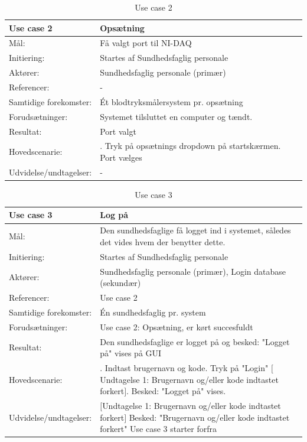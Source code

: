 \begin{table}[H]
\caption{Use case 2}\label{tab:tabel3}
\begin{tabular}{| l | >{\raggedright\arraybackslash}p{11cm} |}
   \hline
   \textbf{Use case 2} & \textbf{Opsætning}\\ \hline
   Mål: & Få valgt port til NI-DAQ \\ \hline
   Initiering: & Startes af Sundhedsfaglig personale\\ \hline
   Aktører:& Sundhedsfaglig personale (primær) \\ \hline
   Referencer: &  -\\ \hline
   Samtidige forekomster: & Ét blodtryksmålersystem pr. opsætning \\\hline
   Forudsætninger: & Systemet tilsluttet en computer og tændt. \\ \hline
   Resultat:& Port valgt\\ \hline
   Hovedscenarie:& 
1. Tryk på opsætnings dropdown på startskærmen\newline
2. Port vælges \\\hline
Udvidelse/undtagelser: & -\\\hline
\end{tabular}
\end{table}



\begin{table}[H]
\caption{Use case 3}\label{tab:tabel3}
\begin{tabular}{| l | >{\raggedright\arraybackslash}p{11cm} |}
   \hline
   \textbf{Use case 3} & \textbf{Log på}\\ \hline
   Mål: & Den sundhedsfaglige få logget ind i systemet, således det vides hvem der benytter dette. \\ \hline
   Initiering: & Startes af Sundhedsfaglig personale\\ \hline
   Aktører:& Sundhedsfaglig personale (primær), Login database (sekundær)\\ \hline
   Referencer: & Use case 2 \\ \hline
   Samtidige forekomster: & Én sundhedsfaglig pr. system \\\hline
   Forudsætninger: & Use case 2: Opsætning, er kørt succesfuldt\\ \hline
   Resultat:& Den sundhedsfaglige er logget på og besked: "Logget på" vises på GUI\\ \hline
   Hovedscenarie:& 
1. Indtast brugernavn og kode\newline
2. Tryk på "Login"\newline
   $[$Undtagelse 1: Brugernavn og/eller kode indtastet forkert$]$\newline
3. Besked: "Logget på" vises.  \\\hline
Udvidelse/undtagelser: & $[$Undtagelse 1: Brugernavn og/eller kode indtastet forkert$]$\newline
1.1 Besked: "Brugernavn og/eller kode indtastet forkert"\newline
1.2 Use case 3 starter forfra \\\hline
\end{tabular}
\end{table}



